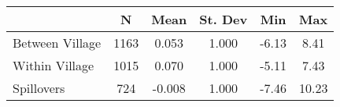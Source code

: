 \begin{tabular}{l*{5}{c}}\hline&\multicolumn{1}{c}{N}&\multicolumn{1}{c}{Mean}&\multicolumn{1}{c}{St. Dev}&\multicolumn{1}{c}{Min}&\multicolumn{1}{c}{Max}\\ \hline 
Between Village & 1163 & 0.053 & 1.000 & -6.13 & 8.41 \\
Within Village & 1015 & 0.070 & 1.000 & -5.11 & 7.43 \\
Spillovers & 724 & -0.008 & 1.000 & -7.46 & 10.23 \\
\hline \end{tabular}
